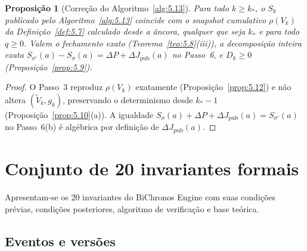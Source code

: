 \documentclass[11pt, a4paper]{article}
\theoremstyle{definition}
\theoremstyle{plain}
\newtheorem{proposicao}[definicao]{Proposição}
\theoremstyle{remark}
\begin{document}
\begin{proposicao}[Correção do Algoritmo~\ref{alg:5.13}]\label{prop:5.14}
Para todo $k \ge k_*$, o $S_k$ publicado pelo Algoritmo~\ref{alg:5.13} coincide com o snapshot cumulativo $\rho(V_k)$ da Definição~\ref{def:5.7} calculado desde a âncora, qualquer que seja $k_*$ e para todo $q \ge 0$. Valem o fechamento exato (Teorema~\ref{teo:5.8}(iii)), a decomposição inteira exata $S_{\sigma'}(a) - S_\sigma(a) = \Delta P + \Delta J_{\text{pub}}(a)$ no Passo~6, e $D_k \ge 0$ (Proposição~\ref{prop:5.9}).
\end{proposicao}
\begin{proof}
O Passo~3 reproduz $\rho(V_k)$ exatamente (Proposição~\ref{prop:5.12}) e não altera $(\tilde{V}_k, g_k)$, preservando o determinismo desde $k_* - 1$ (Proposição~\ref{prop:5.10}(a)). A igualdade $S_\sigma(a) + \Delta P + \Delta J_{\text{pub}}(a) = S_{\sigma'}(a)$ no Passo~6(b) é algébrica por definição de $\Delta J_{\text{pub}}(a)$.
\end{proof}

\section{Conjunto de 20 invariantes formais}\label{sec:6}

Apresentam-se os 20 invariantes do BiChronos Engine com suas condições prévias, condições posteriores, algoritmo de verificação e base teórica.

\subsection{Eventos e versões}
\end{document}
